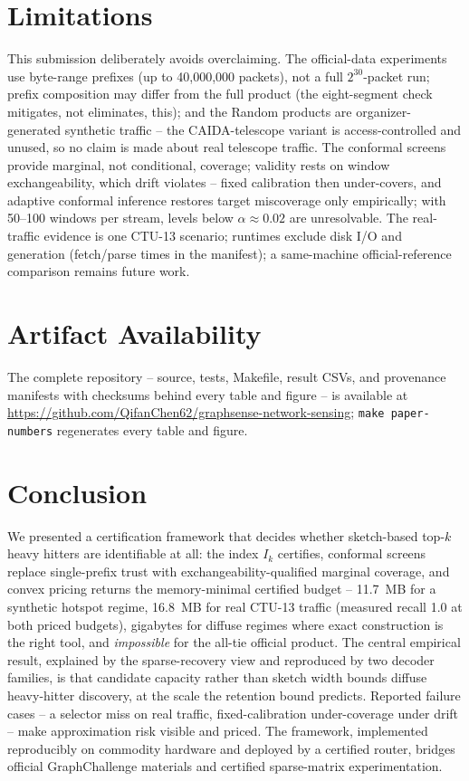 \documentclass[conference]{IEEEtran}
\begin{document}
\section{Limitations}
This submission deliberately avoids overclaiming. The official-data experiments use byte-range prefixes (up to 40{,}000{,}000 packets), not a full $2^{30}$-packet run; prefix composition may differ from the full product (the eight-segment check mitigates, not eliminates, this); and the Random products are organizer-generated synthetic traffic -- the CAIDA-telescope variant is access-controlled and unused, so no claim is made about real telescope traffic. The conformal screens provide marginal, not conditional, coverage; validity rests on window exchangeability, which drift violates -- fixed calibration then under-covers, and adaptive conformal inference restores target miscoverage only empirically; with 50--100 windows per stream, levels below $\alpha\approx0.02$ are unresolvable. The real-traffic evidence is one CTU-13 scenario; runtimes exclude disk I/O and generation (fetch/parse times in the manifest); a same-machine official-reference comparison remains future work.

\section*{Artifact Availability}
The complete repository -- source, tests, Makefile, result CSVs, and provenance manifests with checksums behind every table and figure -- is available at \url{https://github.com/QifanChen62/graphsense-network-sensing}; \texttt{make paper-numbers} regenerates every table and figure.

\section{Conclusion}
We presented a certification framework that decides whether sketch-based top-$k$ heavy hitters are identifiable at all: the index $I_k$ certifies, conformal screens replace single-prefix trust with exchangeability-qualified marginal coverage, and convex pricing returns the memory-minimal certified budget -- 11.7~MB for a synthetic hotspot regime, 16.8~MB for real CTU-13 traffic (measured recall 1.0 at both priced budgets), gigabytes for diffuse regimes where exact construction is the right tool, and \emph{impossible} for the all-tie official product. The central empirical result, explained by the sparse-recovery view and reproduced by two decoder families, is that candidate capacity rather than sketch width bounds diffuse heavy-hitter discovery, at the scale the retention bound predicts. Reported failure cases -- a selector miss on real traffic, fixed-calibration under-coverage under drift -- make approximation risk visible and priced. The framework, implemented reproducibly on commodity hardware and deployed by a certified router, bridges official GraphChallenge materials and certified sparse-matrix experimentation.



\end{document}
